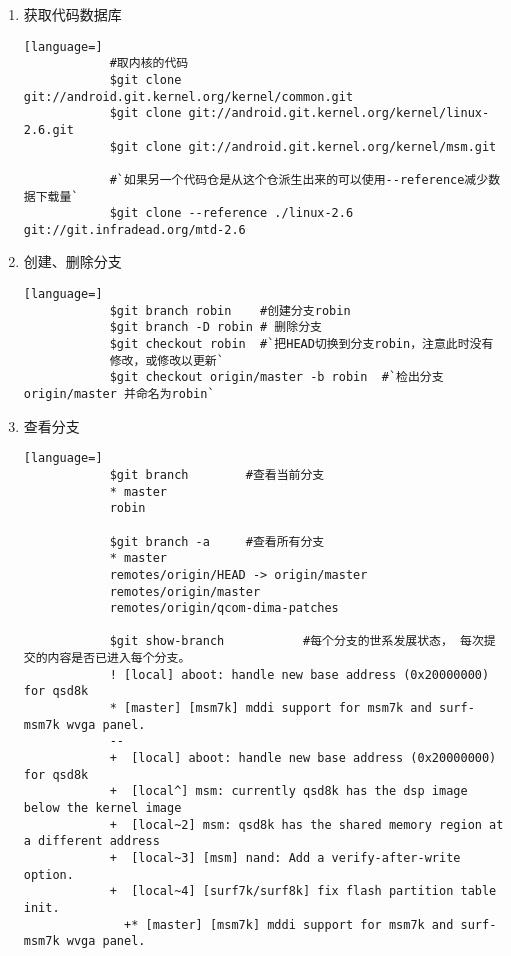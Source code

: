\documentclass[a4paper,titlepage]{article}
\begin{document}
\begin{enumerate}
    \item 获取代码数据库
        \begin{lstlisting}[language=]
            #取内核的代码 
            $git clone git://android.git.kernel.org/kernel/common.git 
            $git clone git://android.git.kernel.org/kernel/linux-2.6.git 
            $git clone git://android.git.kernel.org/kernel/msm.git 

            #`如果另一个代码仓是从这个仓派生出来的可以使用--reference减少数据下载量`
            $git clone --reference ./linux-2.6 git://git.infradead.org/mtd-2.6 
        \end{lstlisting}

    \item 创建、删除分支
        \begin{lstlisting}[language=]
            $git branch robin    #创建分支robin
            $git branch -D robin # 删除分支  
            $git checkout robin  #`把HEAD切换到分支robin，注意此时没有
            修改，或修改以更新`
            $git checkout origin/master -b robin  #`检出分支origin/master 并命名为robin`
        \end{lstlisting}

    \item 查看分支
        \begin{lstlisting}[language=]
            $git branch        #查看当前分支
            * master 
            robin

            $git branch -a     #查看所有分支
            * master 
            remotes/origin/HEAD -> origin/master 
            remotes/origin/master 
            remotes/origin/qcom-dima-patches

            $git show-branch           #每个分支的世系发展状态， 每次提交的内容是否已进入每个分支。
            ! [local] aboot: handle new base address (0x20000000) for qsd8k 
            * [master] [msm7k] mddi support for msm7k and surf-msm7k wvga panel. 
            -- 
            +  [local] aboot: handle new base address (0x20000000) for qsd8k 
            +  [local^] msm: currently qsd8k has the dsp image below the kernel image 
            +  [local~2] msm: qsd8k has the shared memory region at a different address 
            +  [local~3] [msm] nand: Add a verify-after-write option. 
            +  [local~4] [surf7k/surf8k] fix flash partition table init. 
              +* [master] [msm7k] mddi support for msm7k and surf-msm7k wvga panel.
        \end{lstlisting}


\end{enumerate}
\end{document}

